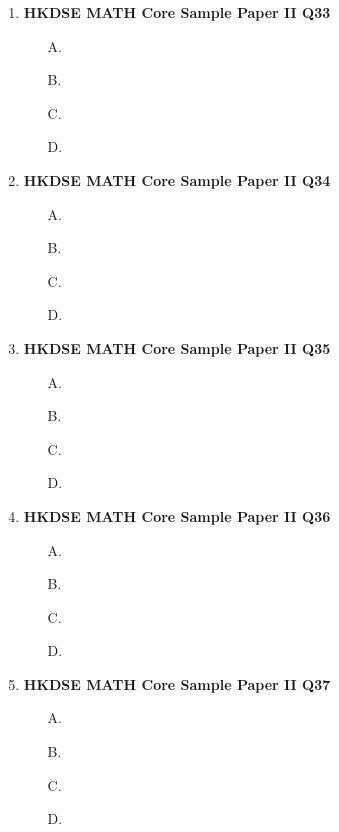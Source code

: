 \documentclass[12pt]{article}
\begin{document}
\begin{enumerate}
	\begin{enumerate}
		\item[A.]
		\item[B.]
		\item[C.]
		\item[D.]
	\end{enumerate}
	\item \textbf{HKDSE MATH Core Sample Paper II Q33}\\
	\begin{enumerate}
		\item[A.]
		\item[B.]
		\item[C.]
		\item[D.]
	\end{enumerate}
	\item \textbf{HKDSE MATH Core Sample Paper II Q34}\\
	\begin{enumerate}
		\item[A.]
		\item[B.]
		\item[C.]
		\item[D.]
	\end{enumerate}
	\item \textbf{HKDSE MATH Core Sample Paper II Q35}\\
	\begin{enumerate}
		\item[A.]
		\item[B.]
		\item[C.]
		\item[D.]
	\end{enumerate}
	\item \textbf{HKDSE MATH Core Sample Paper II Q36}\\
	\begin{enumerate}
		\item[A.]
		\item[B.]
		\item[C.]
		\item[D.]
	\end{enumerate}
	\item \textbf{HKDSE MATH Core Sample Paper II Q37}\\
	\begin{enumerate}
		\item[A.]
		\item[B.]
		\item[C.]
		\item[D.]
	\end{enumerate}

\end{enumerate}
\end{document}
